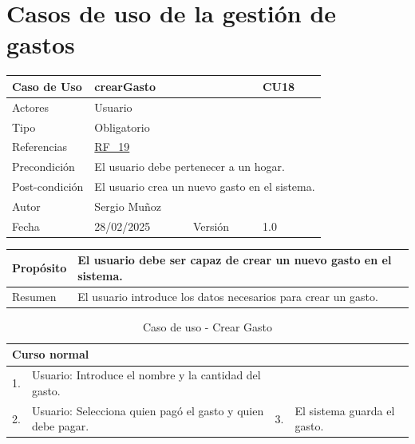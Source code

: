 \clearpage

\section{Casos de uso de la gestión de gastos}

\begin{table}[H]
    \centering
    \begin{tabular}{| m{} | m{} | m{} | m{} |}
        \hline
        \rowcolor[HTML]{C0C0C0} Caso de Uso & \multicolumn{2}{|m{0.43\textwidth}|}{crearGasto} &  CU18\\ 
        \hline
        Actores & \multicolumn{3}{l|}{Usuario} \\ 
        \hline
        Tipo & \multicolumn{3}{l|}{Obligatorio} \\ 
        \hline
        Referencias & \multicolumn{3}{l|}{\hyperref[req:RF19]{RF\_19}} \\ 
        \hline
        Precondición & \multicolumn{3}{m{0.67\textwidth}|}{El usuario debe pertenecer a un hogar.} \\ 
        \hline
        Post-condición & \multicolumn{3}{m{0.67\textwidth}|}{El usuario crea un nuevo gasto en el sistema.} \\ 
        \hline
        Autor & \multicolumn{3}{l|}{Sergio Muñoz} \\ 
        \hline
        Fecha & 28/02/2025 & Versión & 1.0 \\ 
        \hline
    \end{tabular}
\end{table}

\begin{table}[H]
    \centering
    \begin{tabular}{| m{} | m{} | m{} | m{} |}
        \hline
        Propósito & \multicolumn{3}{m{0.67\textwidth}|}{El usuario debe ser capaz de crear un nuevo gasto en el sistema.} \\ 
        \hline
        Resumen & \multicolumn{3}{m{0.67\textwidth}|}{El usuario introduce los datos necesarios para crear un gasto.} \\ 
        \hline
    \end{tabular}
\end{table}

\begin{table}[H]
    \centering
    \begin{tabular}{| m{} | m{} | m{} | m{} |}
        \hline
        \multicolumn{4}{|m{0.9\textwidth}|}{Curso normal} \\ 
        \hline
        1. & Usuario: Introduce el nombre y la cantidad del gasto. 
        &  &  \\ 
        \hline
        2. & Usuario: Selecciona quien pagó el gasto y quien debe pagar. 
        & 3. & El sistema guarda el gasto.  \\ 
        \hline
    \end{tabular}
    \caption{Caso de uso - Crear Gasto}
\end{table}


